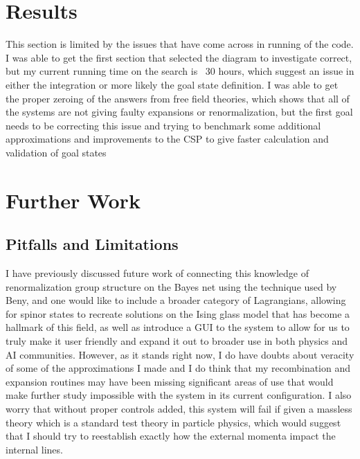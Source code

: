 \documentclass{article}
\begin{document}
\section{Results}
This section is limited by the issues that have come across in running of the code. I was able to get the first section that selected the diagram to investigate correct, but my current running time on the search is ~30 hours, which suggest an issue in either the integration or more likely the goal state definition. I was able to get the proper zeroing of the answers from free field theories, which shows that all of the systems are not giving faulty expansions or renormalization, but the first goal needs to be correcting this issue and trying to benchmark some additional approximations and improvements to the CSP to give faster calculation and validation of goal states 


\section{Further Work}

\subsection{Pitfalls and Limitations}
I have previously discussed future work of connecting this knowledge of renormalization group structure on the Bayes net using the technique used by Beny, and one would like to include a broader category of Lagrangians, allowing for spinor states to recreate solutions on the Ising glass model that has become a hallmark of this field, as well as introduce a GUI to the system to allow for us to truly make it user friendly and expand it out to broader use in both physics and AI communities. 
However, as it stands right now, I do have doubts about veracity of some of the approximations I made and I do think that my recombination and expansion routines may have been missing significant areas of use that would make further study impossible with the system in its current configuration. I also worry that without proper controls added, this system will fail if given a massless theory which is a standard test theory in particle physics, which would suggest that I should try to reestablish exactly how the external momenta impact the internal lines. 


\end{document}
